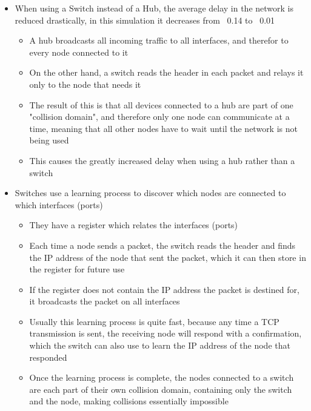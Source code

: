 \begin{itemize}
  \item When using a Switch instead of a Hub, the average delay in the network is reduced drastically, in this simulation it decreases from ~0.14 to ~0.01
  \begin{itemize}
    \item A hub broadcasts all incoming traffic to all interfaces, and therefor to every node connected to it
    \item On the other hand, a switch reads the header in each packet and relays it only to the node that needs it
    \item The result of this is that all devices connected to a hub are part of one "collision domain", and therefore only one node can communicate at a time, meaning that all other nodes have to wait until the network is not being used
    \item This causes the greatly increased delay when using a hub rather than a switch
  \end{itemize}
  \item Switches use a learning process to discover which nodes are connected to which interfaces (ports)
  \begin{itemize}
    \item They have a register which relates the interfaces (ports)
    \item Each time a node sends a packet, the switch reads the header and finds the IP address of the node that sent the packet, which it can then store in the register for future use
    \item If the register does not contain the IP address the packet is destined for, it broadcasts the packet on all interfaces
    \item Usually this learning process is quite fast, because any time a TCP transmission is sent, the receiving node will respond with a confirmation, which the switch can also use to learn the IP address of the node that responded
    \item Once the learning process is complete, the nodes connected to a switch are each part of their own collision domain, containing only the switch and the node, making collisions essentially impossible
  \end{itemize}
\end{itemize}